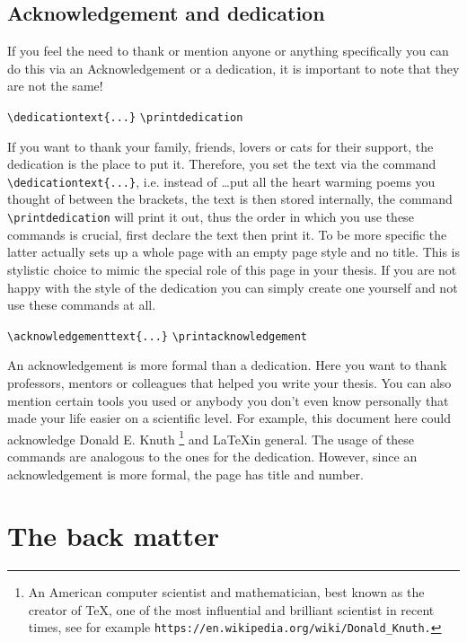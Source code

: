 \subsection{Acknowledgement and dedication}
If you feel the need to thank or mention anyone or anything specifically you can do this 
via an Acknowledgement or a dedication, it is important to note that they are not the same!
\begin{emphBox}
\lstinline|\dedicationtext{...}|
\lstinline|\printdedication|	
\end{emphBox}
If you want to thank your family, friends, lovers or cats for their support, the dedication 
is the place to put it. Therefore, you set the text via the command 
\lstinline|\dedicationtext{...}|, i.e. instead of \ldots put all the heart warming poems 
you thought of between the brackets, the text is then stored internally, the command 
\lstinline|\printdedication| will print it out, thus the order in which you use these 
commands is crucial, first declare the text then print it. To be more specific the latter 
actually sets up a whole page with an empty page style and no title. This is stylistic 
choice to mimic the special role of this page in your thesis. If you are not happy with the 
style of the dedication you can simply create one yourself and not use these commands at all.
\begin{emphBox}
\lstinline|\acknowledgementtext{...}|
\lstinline|\printacknowledgement|	
\end{emphBox}
An acknowledgement is more formal than a dedication. Here you want to thank professors, 
mentors or colleagues that helped you write your thesis. You can also mention certain 
tools you used or anybody you don't even know personally that made your life easier 
on a scientific level. For example, this document here could acknowledge 
Donald E. Knuth \footnote{An American computer scientist and mathematician, best known 
as the creator of \TeX, one of the most influential and brilliant scientist in recent 
times, see for example \texttt{https://en.wikipedia.org/wiki/Donald\_Knuth.}}
and \LaTeX in general.  
The usage of these commands are analogous to the ones for the dedication. However, since 
an acknowledgement is more formal, the page has title and number.  
\section{The back matter}\label{sec:back}
